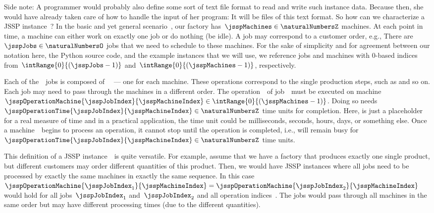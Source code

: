 Side note:
A programmer would probably also define some sort of text file format to read and write such instance data.
Because then, she would have already taken care of how to handle the input of her program:
It will be files of this text format.%
%
%
%
\endhsection%
%
%
%
\label{sec:jsspInstance}%
%
%
\label{sec:jsspInstanceStructure}%
%
So how can we characterize a \gls{JSSP} instance~\instance?
In the basic and yet general scenario~\cite{GLLRK1979OAAIDSASAS,LLRKS1993SASAAC,L1982RRITTOMS,T1993BFBSP}, our factory has~$\jsspMachines\in\naturalNumbersZ$ machines.
At each point in time, a machine can either work on exactly one job or do nothing (be idle).
A job may correspond to a customer order, e.g., 
There are~$\jsspJobs\in\naturalNumbersO$ jobs that we need to schedule to these machines.
For the sake of simplicity and for agreement between our notation here, the Python source code, and the example instances that we will use, we reference jobs and machines with 0\nobreakdash-based indices from~$\intRange{0}{(\jsspJobs-1)}$ and~$\intRange{0}{(\jsspMachines-1)}$, respectively.

Each of the~\jsspJobs\ jobs is composed of~\jsspMachines\  --- one for each machine.
These operations correspond to the single production steps, such as   and so on.
Each job may need to pass through the machines in a different order.
The operation~\jsspMachineIndex\ of job~\jsspJobIndex\ must be executed on machine~$\jsspOperationMachine{\jsspJobIndex}{\jsspMachineIndex}\in \intRange{0}{(\jsspMachines-1)}$.
Doing so needs~$\jsspOperationTime{\jsspJobIndex}{\jsspMachineIndex}\in\naturalNumbersZ$ time units for completion.
Here,  is just a placeholder for a real measure of time and in a practical application, the time unit could be milliseconds, seconds, hours, days, or something else.
Once a machine~\jsspMachineIndex\ begins to process an operation, it cannot stop until the operation is completed, i.e., will remain busy for~$\jsspOperationTime{\jsspJobIndex}{\jsspMachineIndex}\in\naturalNumbersZ$ time units.

This definition of a \gls{JSSP} instance~\instance\ is quite versatile.
For example, assume that we have a factory that produces exactly one single product, but different customers may order different quantities of this product.
Then, we would have \gls{JSSP} instances where all jobs need to be processed by exactly the same machines in exactly the same sequence.
In this case~$\jsspOperationMachine{\jsspJobIndex_1}{\jsspMachineIndex}=\jsspOperationMachine{\jsspJobIndex_2}{\jsspMachineIndex}$ would hold for all jobs~$\jsspJobIndex_1$ and~$\jsspJobIndex_2$ and all operation indices~\jsspMachineIndex.
The jobs would pass through all machines in the same order but may have different processing times (due to the different quantities).

